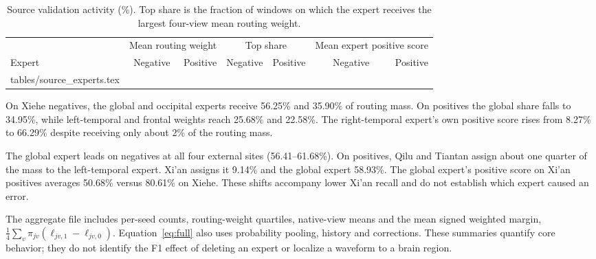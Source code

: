 \begin{table}[ht]
\caption{Source validation activity (\%). Top share is the fraction of windows on which the expert receives the largest four-view mean routing weight.}\label{tab:expert-source}
\centering\small
\begin{tabular}{@{}lrrrrrr@{}}
\toprule & \multicolumn{2}{c}{Mean routing weight} & \multicolumn{2}{c}{Top share} & \multicolumn{2}{c}{Mean expert positive score}\\
\cmidrule(lr){2-3}\cmidrule(lr){4-5}\cmidrule(l){6-7}
Expert & Negative & Positive & Negative & Positive & Negative & Positive\\ \midrule
{} tables/source_experts.tex
\bottomrule
\end{tabular}
\end{table}

On Xiehe negatives, the global and occipital experts receive 56.25\% and 35.90\% of routing mass. On positives the global share falls to 34.95\%, while left-temporal and frontal weights reach 25.68\% and 22.58\%. The right-temporal expert's own positive score rises from 8.27\% to 66.29\% despite receiving only about 2\% of the routing mass.

The global expert leads on negatives at all four external sites (56.41--61.68\%). On positives, Qilu and Tiantan assign about one quarter of the mass to the left-temporal expert. Xi'an assigns it 9.14\% and the global expert 58.93\%. The global expert's positive score on Xi'an positives averages 50.68\% versus 80.61\% on Xiehe. These shifts accompany lower Xi'an recall and do not establish which expert caused an error.

The aggregate file includes per-seed counts, routing-weight quartiles, native-view means and the mean signed weighted margin, $\frac14\sum_v\pi_{jv}(\ell_{jv,1}-\ell_{jv,0})$. Equation~\eqref{eq:full} also uses probability pooling, history and corrections. These summaries quantify core behavior; they do not identify the F1 effect of deleting an expert or localize a waveform to a brain region.

